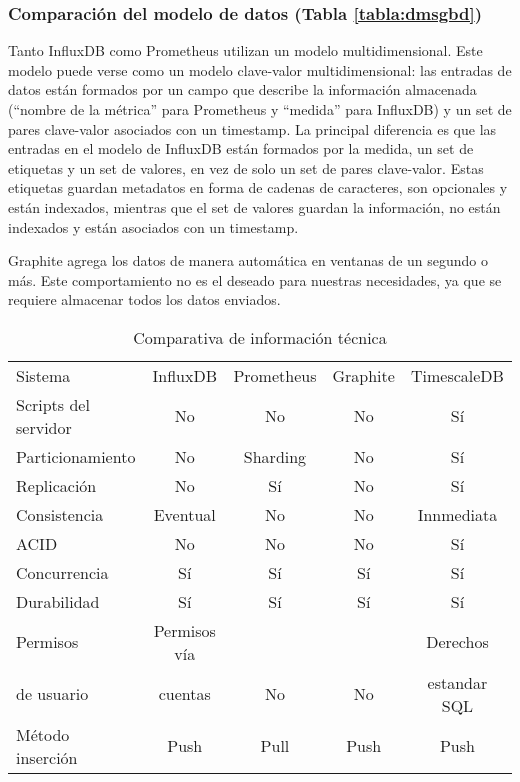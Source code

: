 \subsubsection*{Comparación del modelo de datos (Tabla \ref*{tabla:dmsgbd})} Tanto InfluxDB como Prometheus utilizan un modelo 
multidimensional. Este modelo puede verse como un modelo clave-valor multidimensional: las entradas de datos están formados 
por un campo que describe la información almacenada (``nombre de la métrica'' para Prometheus y ``medida'' para InfluxDB) 
y un set de pares clave-valor asociados con un timestamp. La principal diferencia es que las entradas en el modelo de InfluxDB 
están formados por la medida, un set de etiquetas y un set de valores, en vez de solo un set de pares clave-valor. 
Estas etiquetas guardan metadatos en forma de cadenas de caracteres, son opcionales y están indexados, mientras que el set de 
valores guardan la información, no están indexados y están asociados con un timestamp.

Graphite agrega los datos de manera automática en ventanas de un segundo o más. Este comportamiento no es el deseado 
para nuestras necesidades, ya que se requiere almacenar todos los datos enviados.

\begin{table}[H]
    \begin{center}
        \begin{adjustbox}{max width=\textwidth}
            \begin{tabular}{l c c c c}
                \toprule
                Sistema & InfluxDB & Prometheus & Graphite & TimescaleDB \\
                \otoprule
                Scripts del servidor & No & No & No & Sí \\
                \rowcolor{gray!35}
                Particionamiento & No & Sharding & No & Sí \\
                Replicación & No & Sí & No & Sí \\
                \rowcolor{gray!35}
                Consistencia & Eventual & No & No & Innmediata \\
                ACID& No & No & No & Sí \\
                \rowcolor{gray!35}
                Concurrencia & Sí & Sí & Sí & Sí \\
                Durabilidad & Sí & Sí & Sí & Sí \\
                \rowcolor{gray!35}
                Permisos                   & Permisos vía    &                      &                      & Derechos \\
                \rowcolor{gray!35}
                de usuario & cuentas & \multirow{-2}{*}{No} & \multirow{-2}{*}{No} & estandar SQL \\
                Método inserción & Push & Pull & Push & Push \\
                \bottomrule
            \end{tabular}
        \end{adjustbox}
        \caption{Comparativa de información técnica}
        \label{tabla:tisgbd}
    \end{center}
\end{table}

